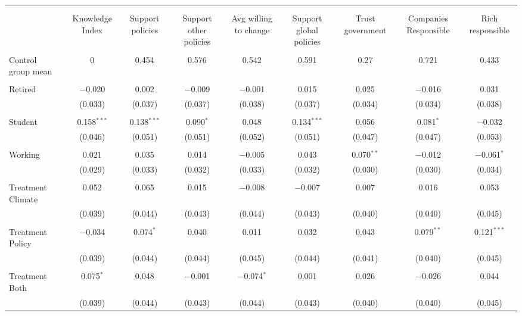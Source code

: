 
\begin{tabular}{@{\extracolsep{5pt}}lcccccccc} 
\\[-1.8ex]\hline 
\hline \\[-1.8ex] 
\\[-1.8ex] & Knowledge Index & Support policies & Support other policies & Avg willing to change & Support global policies & Trust government & Companies Responsible & Rich responsible \\ 
\hline \\[-1.8ex] 
 Control group mean & 0 & 0.454 & 0.576 & 0.542 & 0.591 & 0.27 & 0.721 & 0.433  \\ \hline \\[-1.8ex] Retired & $-$0.020 & 0.002 & $-$0.009 & $-$0.001 & 0.015 & 0.025 & $-$0.016 & 0.031 \\ 
  & (0.033) & (0.037) & (0.037) & (0.038) & (0.037) & (0.034) & (0.034) & (0.038) \\ 
  & & & & & & & & \\ 
 Student & 0.158$^{***}$ & 0.138$^{***}$ & 0.090$^{*}$ & 0.048 & 0.134$^{***}$ & 0.056 & 0.081$^{*}$ & $-$0.032 \\ 
  & (0.046) & (0.051) & (0.051) & (0.052) & (0.051) & (0.047) & (0.047) & (0.053) \\ 
  & & & & & & & & \\ 
 Working & 0.021 & 0.035 & 0.014 & $-$0.005 & 0.043 & 0.070$^{**}$ & $-$0.012 & $-$0.061$^{*}$ \\ 
  & (0.029) & (0.033) & (0.032) & (0.033) & (0.032) & (0.030) & (0.030) & (0.034) \\ 
  & & & & & & & & \\ 
 Treatment Climate & 0.052 & 0.065 & 0.015 & $-$0.008 & $-$0.007 & 0.007 & 0.016 & 0.053 \\ 
  & (0.039) & (0.044) & (0.043) & (0.044) & (0.043) & (0.040) & (0.040) & (0.045) \\ 
  & & & & & & & & \\ 
 Treatment Policy & $-$0.034 & 0.074$^{*}$ & 0.040 & 0.011 & 0.032 & 0.043 & 0.079$^{**}$ & 0.121$^{***}$ \\ 
  & (0.039) & (0.044) & (0.044) & (0.045) & (0.044) & (0.041) & (0.040) & (0.045) \\ 
  & & & & & & & & \\ 
 Treatment Both & 0.075$^{*}$ & 0.048 & $-$0.001 & $-$0.074$^{*}$ & 0.001 & 0.026 & $-$0.026 & 0.044 \\ 
  & (0.039) & (0.044) & (0.043) & (0.044) & (0.043) & (0.040) & (0.040) & (0.045) \\ 

\end{tabular}
